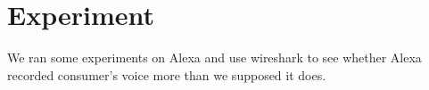 
%
%
%
%
%

\section{Experiment}

We ran some experiments on Alexa and use wireshark to see whether Alexa recorded consumer's voice more than we supposed it does.

